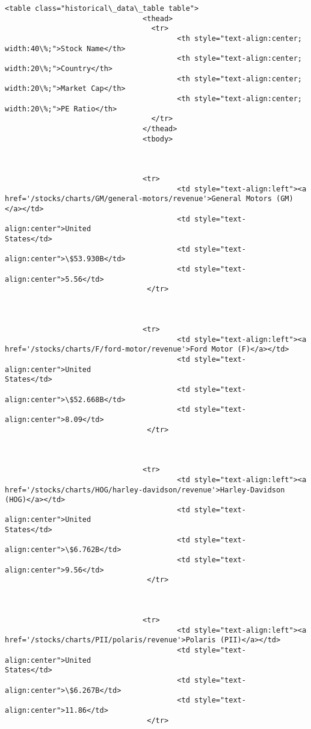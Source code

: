 \documentclass[11pt]{article}
\begin{document}
\begin{Verbatim}[commandchars=\\\{\}]
                                <table class="historical\_data\_table table">
                                <thead>
                                  <tr>
                                        <th style="text-align:center;
width:40\%;">Stock Name</th>
                                        <th style="text-align:center;
width:20\%;">Country</th>
                                        <th style="text-align:center;
width:20\%;">Market Cap</th>
                                        <th style="text-align:center;
width:20\%;">PE Ratio</th>
                                  </tr>
                                </thead>
                                <tbody>



                                <tr>
                                        <td style="text-align:left"><a
href='/stocks/charts/GM/general-motors/revenue'>General Motors (GM)</a></td>
                                        <td style="text-align:center">United
States</td>
                                        <td style="text-
align:center">\$53.930B</td>
                                        <td style="text-align:center">5.56</td>
                                 </tr>



                                <tr>
                                        <td style="text-align:left"><a
href='/stocks/charts/F/ford-motor/revenue'>Ford Motor (F)</a></td>
                                        <td style="text-align:center">United
States</td>
                                        <td style="text-
align:center">\$52.668B</td>
                                        <td style="text-align:center">8.09</td>
                                 </tr>



                                <tr>
                                        <td style="text-align:left"><a
href='/stocks/charts/HOG/harley-davidson/revenue'>Harley-Davidson (HOG)</a></td>
                                        <td style="text-align:center">United
States</td>
                                        <td style="text-
align:center">\$6.762B</td>
                                        <td style="text-align:center">9.56</td>
                                 </tr>



                                <tr>
                                        <td style="text-align:left"><a
href='/stocks/charts/PII/polaris/revenue'>Polaris (PII)</a></td>
                                        <td style="text-align:center">United
States</td>
                                        <td style="text-
align:center">\$6.267B</td>
                                        <td style="text-align:center">11.86</td>
                                 </tr>




\end{Verbatim}
\end{document}
